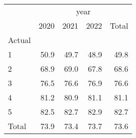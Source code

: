 \documentclass{article}
\begin{document}
\begin{minipage}[b]{.40\textwidth}
\begin{tabular}{lllll}
	\cline{1-5}
	\multicolumn{1}{c}{} &
	\multicolumn{4}{|c}{year} \\
	\multicolumn{1}{c}{} &
	\multicolumn{1}{|r}{2020} &
	\multicolumn{1}{r}{2021} &
	\multicolumn{1}{r}{2022} &
	\multicolumn{1}{r}{Total} \\
	\cline{1-5}
	\multicolumn{1}{l}{Actual} &
	\multicolumn{1}{|r}{} &
	\multicolumn{1}{r}{} &
	\multicolumn{1}{r}{} &
	\multicolumn{1}{r}{} \\
	\multicolumn{1}{l}{\hspace{1em}1} &
	\multicolumn{1}{|r}{50.9} &
	\multicolumn{1}{r}{49.7} &
	\multicolumn{1}{r}{48.9} &
	\multicolumn{1}{r}{49.8} \\
	\multicolumn{1}{l}{\hspace{1em}2} &
	\multicolumn{1}{|r}{68.9} &
	\multicolumn{1}{r}{69.0} &
	\multicolumn{1}{r}{67.8} &
	\multicolumn{1}{r}{68.6} \\
	\multicolumn{1}{l}{\hspace{1em}3} &
	\multicolumn{1}{|r}{76.5} &
	\multicolumn{1}{r}{76.6} &
	\multicolumn{1}{r}{76.9} &
	\multicolumn{1}{r}{76.6} \\
	\multicolumn{1}{l}{\hspace{1em}4} &
	\multicolumn{1}{|r}{81.2} &
	\multicolumn{1}{r}{80.9} &
	\multicolumn{1}{r}{81.1} &
	\multicolumn{1}{r}{81.1} \\
	\multicolumn{1}{l}{\hspace{1em}5} &
	\multicolumn{1}{|r}{82.5} &
	\multicolumn{1}{r}{82.7} &
	\multicolumn{1}{r}{82.9} &
	\multicolumn{1}{r}{82.7} \\
	\multicolumn{1}{l}{\hspace{1em}Total} &
	\multicolumn{1}{|r}{73.9} &
	\multicolumn{1}{r}{73.4} &
	\multicolumn{1}{r}{73.7} &
	\multicolumn{1}{r}{73.6} \\
	\cline{1-5}
\end{tabular}
\end{minipage}\qquad
\end{document}
